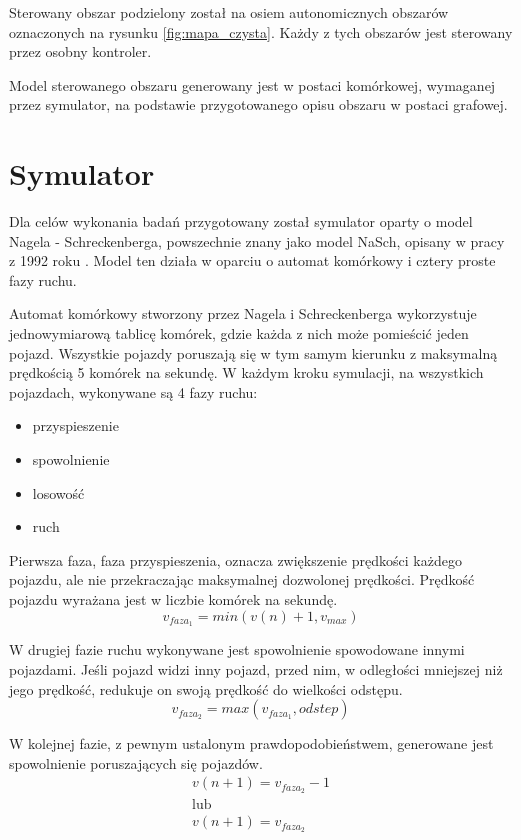 Sterowany obszar podzielony został na osiem autonomicznych obszarów oznaczonych na rysunku \ref{fig:mapa_czysta}. Każdy z tych obszarów jest sterowany przez osobny kontroler.

Model sterowanego obszaru generowany jest w postaci komórkowej, wymaganej przez symulator, na podstawie przygotowanego opisu obszaru w postaci grafowej.

\section{Symulator}
Dla celów wykonania badań przygotowany został symulator oparty o model Nagela - Schreckenberga, powszechnie znany jako model NaSch, opisany w pracy z 1992 roku \cite{nasch}. Model ten działa w oparciu o automat komórkowy i cztery proste fazy ruchu.

Automat komórkowy stworzony przez Nagela i Schreckenberga wykorzystuje jednowymiarową tablicę komórek, gdzie każda z nich może pomieścić jeden pojazd. Wszystkie pojazdy poruszają się w tym samym kierunku z maksymalną prędkością 5 komórek na sekundę. W każdym kroku symulacji, na wszystkich pojazdach, wykonywane są 4 fazy ruchu:

\begin{itemize}
	\item przyspieszenie
	\item spowolnienie
	\item losowość
	\item ruch
\end{itemize}

Pierwsza faza, faza przyspieszenia, oznacza zwiększenie prędkości każdego pojazdu, ale nie przekraczając maksymalnej dozwolonej prędkości.
Prędkość pojazdu wyrażana jest w liczbie komórek na sekundę.
\begin {equation}
	v_{faza_1} = min (v(n) + 1, v_{max})
\end {equation}

W drugiej fazie ruchu wykonywane jest spowolnienie spowodowane innymi pojazdami. Jeśli pojazd widzi inny pojazd, przed nim, w odległości mniejszej niż jego prędkość, redukuje on swoją prędkość do wielkości odstępu.
\begin {equation}
	v_{faza_2} = max (v_{faza_1}, odstep)
\end{equation}

W kolejnej fazie, z pewnym ustalonym prawdopodobieństwem, generowane jest spowolnienie poruszających się pojazdów.
\begin {equation}
	\begin{array} {c}
		v(n+1) = v_{faza_2} - 1\\
		\textrm{lub}\\
		v(n+1) = v_{faza_2}
	\end{array}
\end{equation}

